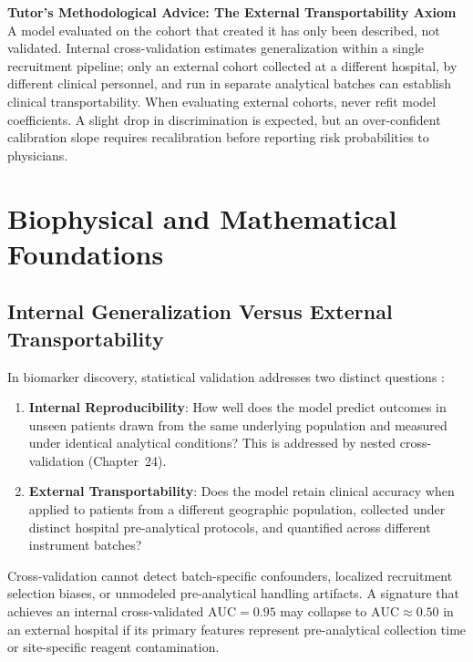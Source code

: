 \documentclass[11pt,twoside,openright]{book}
\begin{document}
\FloatBarrier

\begin{notebox}
\textbf{Tutor's Methodological Advice: The External Transportability Axiom}\\
A model evaluated on the cohort that created it has only been described, not validated. Internal cross-validation estimates generalization within a single recruitment pipeline; only an external cohort collected at a different hospital, by different clinical personnel, and run in separate analytical batches can establish clinical transportability. When evaluating external cohorts, never refit model coefficients. A slight drop in discrimination is expected, but an over-confident calibration slope requires recalibration before reporting risk probabilities to physicians.
\end{notebox}

\section{Biophysical and Mathematical Foundations}

\subsection{Internal Generalization Versus External Transportability}

In biomarker discovery, statistical validation addresses two distinct questions \cite{steyerberg2010towards}:
\begin{enumerate}
    \item \textbf{Internal Reproducibility}: How well does the model predict outcomes in unseen patients drawn from the same underlying population and measured under identical analytical conditions? This is addressed by nested cross-validation (Chapter~24).
    \item \textbf{External Transportability}: Does the model retain clinical accuracy when applied to patients from a different geographic population, collected under distinct hospital pre-analytical protocols, and quantified across different instrument batches?
\end{enumerate}

Cross-validation cannot detect batch-specific confounders, localized recruitment selection biases, or unmodeled pre-analytical handling artifacts. A signature that achieves an internal cross-validated $\text{AUC} = 0.95$ may collapse to $\text{AUC} \approx 0.50$ in an external hospital if its primary features represent pre-analytical collection time or site-specific reagent contamination.
\end{document}
